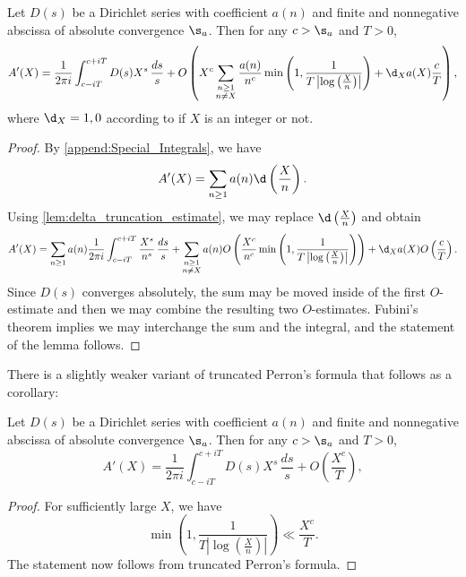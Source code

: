     \begin{theorem}
      Let $D(s)$ be a Dirichlet series with coefficient $a(n)$ and finite and nonnegative abscissa of absolute convergence $\s_{a}$. Then for any $c > \s_{a}$ and $T > 0$,
      \[
        A'(X) = \frac{1}{2\pi i}\int_{c-iT}^{c+iT}D(s)X^{s}\,\frac{ds}{s}+O\left(X^{c}\sum_{\substack{n \ge 1 \\ n \neq X}}\frac{a(n)}{n^{c}}\min\left(1,\frac{1}{T\left|\log\left(\frac{X}{n}\right)\right|}\right)+\d_{X}a(X)\frac{c}{T}\right),
      \]
      where $\d_{X} = 1,0$ according to if $X$ is an integer or not.
    \end{theorem}
    \begin{proof}
      By \cref{append:Special_Integrals}, we have
      \[
        A'(X) = \sum_{n \ge 1}a(n)\d\left(\frac{X}{n}\right).
      \]
      Using \cref{lem:delta_truncation_estimate}, we may replace $\d\left(\frac{X}{n}\right)$ and obtain
      \[
        A'(X) = \sum_{n \ge 1}a(n)\frac{1}{2\pi i}\int_{c-iT}^{c+iT}\frac{X^{s}}{n^{s}}\,\frac{ds}{s}+\sum_{\substack{n \ge 1 \\ n \neq X}}a(n)O\left(\frac{X^{c}}{n^{c}}\min\left(1,\frac{1}{T\left|\log\left(\frac{X}{n}\right)\right|}\right)\right)+\d_{X}a(X)O\left(\frac{c}{T}\right).
      \]
      Since $D(s)$ converges absolutely, the sum may be moved inside of the first $O$-estimate and then we may combine the resulting two $O$-estimates. Fubini's theorem implies we may interchange the sum and the integral, and the statement of the lemma follows.
    \end{proof}

    There is a slightly weaker variant of truncated Perron's formula that follows as a corollary:

    \begin{corollary}
      Let $D(s)$ be a Dirichlet series with coefficient $a(n)$ and finite and nonnegative abscissa of absolute convergence $\s_{a}$. Then for any $c > \s_{a}$ and $T > 0$,
      \[
        A'(X) = \frac{1}{2\pi i}\int_{c-iT}^{c+iT}D(s)X^{s}\,\frac{ds}{s}+O\left(\frac{X^{c}}{T}\right),
      \]
    \end{corollary}
    \begin{proof}
      For sufficiently large $X$, we have
      \[
        \min\left(1,\frac{1}{T\left|\log\left(\frac{X}{n}\right)\right|}\right) \ll \frac{X^{c}}{T}.
      \]
      The statement now follows from truncated Perron's formula.
    \end{proof}

